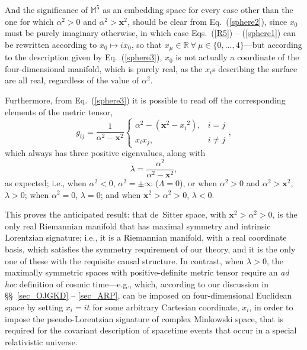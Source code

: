 And the significance of $\mathbb{M}^5$ as an embedding space for every case other than the one for which $\alpha^2>0$ and $\alpha^2>\mathbf{x}^2$, should be clear from Eq.~(\ref{sphere2}), since $x_0$ must be purely imaginary otherwise, in which case Eqs.~(\ref{R5}) -- (\ref{sphere1}) can be rewritten according to $x_0\mapsto{ix_0}$, so that $x_{\mu}\in\mathbb{R}~\forall~\mu\in\{0,...,4\}$---but according to the description given by Eq.~(\ref{sphere3}), $x_0$ is not actually a coordinate of the four-dimensional manifold, which is purely real, as the $x_i$s describing the surface are all real, regardless of the value of $\alpha^2$. 

Furthermore, from Eq.~(\ref{sphere3}) it is possible to read off the corresponding elements of the metric tensor,
\begin{equation}
g_{ij}=\frac{1}{\alpha^2-\mathbf{x}^2}\left\{\begin{array}{ll}
\alpha^2-(\mathbf{x}^2-{x_i}^2), & i=j \\ 
x_ix_j, & i\neq{j}
\end{array}\right.,\label{sphere4}
\end{equation}
which always has three positive eigenvalues, along with
\begin{equation}
\lambda=\frac{\alpha^2}{\alpha^2-\mathbf{x}^2},\label{eigenvalue}
\end{equation}
as expected; i.e., when $\alpha^2<0$, $\alpha^2=\pm\infty$ ($\Lambda=0$), or when $\alpha^2>0$ and $\alpha^2>\mathbf{x}^2$, $\lambda>0$; when $\alpha^2=0$, $\lambda=0$; and when $\mathbf{x}^2>\alpha^2>0$, $\lambda<0$.

This proves the anticipated result: that de~Sitter space, with $\mathbf{x}^2>\alpha^2>0$, is the only real Riemannian manifold that has maximal symmetry and intrinsic Lorentzian signature; i.e., it is a Riemannian manifold, with a real coordinate basis, which satisfies the symmetry requirement of our theory, and it is the only one of these with the requisite causal structure. In contrast, when $\lambda>0$, the maximally symmetric spaces with positive-definite metric tensor require an \textit{ad hoc} definition of cosmic time---e.g., which, according to our discussion in \S\S~\ref{sec_OJGKD} -- \ref{sec_ARP}, can be imposed on four-dimensional Euclidean space by setting $x_i=it$ for some arbitrary Cartesian coordinate, $x_i$, in order to impose the pseudo-Lorentzian signature of complex Minkowski space, that is required for the covariant description of spacetime events that occur in a special relativistic universe.


